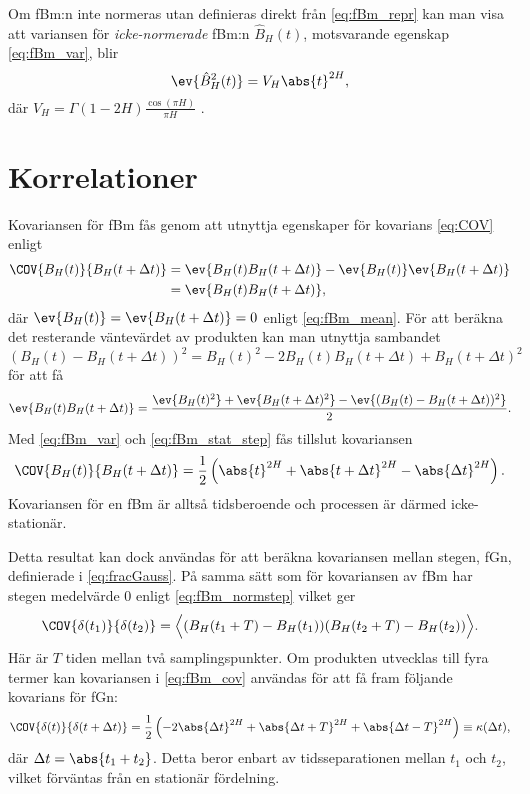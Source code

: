 Om fBm:n inte normeras utan definieras direkt från \eqref{eq:fBm_repr} kan man visa att variansen för \emph{icke-normerade} fBm:n $\hat{B}_H(t)$, motsvarande egenskap \eqref{eq:fBm_var}, blir \cite{Dieker_fBm}
\begin{equation} \label{eq:fBm_onorm_var}
    \ev{\hat{B}^2_H(t)} = V_H \abs{t}^{2H},
\end{equation}
där $V_H = \Gamma(1-2H)\frac{\cos(\pi H)}{\pi H}$ \cite{Flandrin_fBmspektrum1989}.


\section{Korrelationer}
Kovariansen för fBm fås genom att utnyttja egenskaper för kovarians \eqref{eq:COV} enligt
\begin{equation}
\begin{aligned}
    \COV{B_H(t)}{B_H(t+\Delta{t})}&=\ev{B_H(t)B_H(t+\Delta{t})}-\ev{B_H(t)}\ev{B_H(t+\Delta{t})}
    \\
    &=\ev{B_H(t)B_H(t+\Delta{t})},
\end{aligned}
\end{equation}
där $\ev{B_H(t)}=\ev{B_H(t+\Delta{t})}=0$ enligt \eqref{eq:fBm_mean}. För att beräkna det resterande väntevärdet av produkten kan man utnyttja sambandet $(B_H(t)-B_H(t+\Delta{t}))^2=B_H(t)^2 -2B_H(t)B_H(t+\Delta{t})+B_H(t+\Delta{t})^2$ för att få
\begin{equation}
    \ev{B_H(t)B_H(t+\Delta{t})}
    =\frac{
    \ev{B_H(t)^2} + \ev{B_H(t+\Delta{t})^2} - \ev{(B_H(t)-B_H(t+\Delta{t}))^2}
    }{2}.
\end{equation}
Med \eqref{eq:fBm_var} och \eqref{eq:fBm_stat_step} fås tillslut kovariansen
\begin{equation} \label{eq:fBm_cov}
    \COV{B_H(t)}{B_H(t+\Delta{t})} = \frac{1}{2}\left(\abs{t}^{2H}+\abs{t+\Delta t}^{2H}-\abs{\Delta{t}}^{2H}\right).
\end{equation}
Kovariansen för en fBm är alltså tidsberoende och processen är därmed icke-stationär. 

Detta resultat kan dock användas för att beräkna kovariansen mellan stegen, fGn, definierade i \eqref{eq:fracGauss}. På samma sätt som för kovariansen av fBm har stegen medelvärde 0 enligt  \eqref{eq:fBm_normstep} vilket ger
\begin{equation}
    \COV{\delta(t_1)}{\delta(t_2)} = \Big\langle(B_H(t_1+T)-B_H(t_1))(B_H(t_2+T)-B_H(t_2))\Big\rangle.
\end{equation}
Här är $T$ tiden mellan två samplingspunkter. Om produkten utvecklas till fyra termer kan kovariansen i \eqref{eq:fBm_cov} användas för att få fram följande kovarians för fGn:
\begin{equation} \label{eq:fGn_cov}
    \COV{\delta(t)}{\delta(t+\Delta{t})} 
    = \frac{1}{2}
    \left(-2\abs{\Delta{t}}^{2H}+\abs{\Delta{t}+T}^{2H}+\abs{\Delta{t}-T}^{2H}\right) 
    \equiv \kappa(\Delta{t}),
\end{equation}
där $\Delta{t}=\abs{t_1+t_2}$.
Detta beror enbart av tidsseparationen mellan $t_1$ och $t_2$, vilket förväntas från en stationär fördelning.


